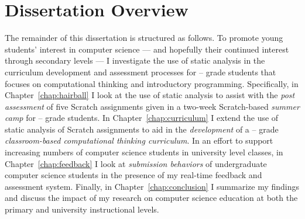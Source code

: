 \section{Dissertation Overview}
The remainder of this dissertation is structured as follows. To promote young
students’ interest in computer science --- and hopefully their continued
interest through secondary levels --- I investigate the use of static analysis
in the curriculum development and assessment processes for --
grade students that focuses on computational thinking and introductory
programming. Specifically, in Chapter~\ref{chap:hairball} I look at the use of
static analysis to assist with the \emph{post assessment} of five Scratch
assignments given in a two-week Scratch-based \emph{summer camp} for
-- grade students. In Chapter~\ref{chap:curriculum} I extend the
use of static analysis of Scratch assignments to aid in the \emph{development}
of a -- grade \emph{classroom-based computational thinking
  curriculum}. In an effort to support increasing numbers of computer science
students in university level classes, in Chapter~\ref{chap:feedback} I look at
\emph{submission behaviors} of undergraduate computer science students in the
presence of my real-time feedback and assessment system. Finally, in
Chapter~\ref{chap:conclusion} I summarize my findings and discuss the impact of
my research on computer science education at both the primary and university
instructional levels.
